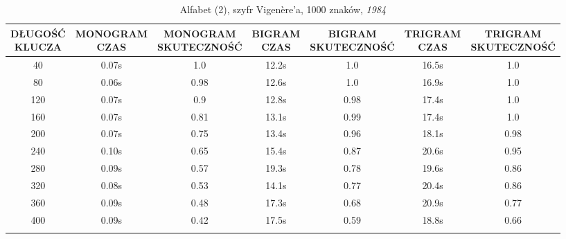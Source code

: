 \documentclass[a4paper]{article}
\theoremstyle{defn}
\theoremstyle{theorem}
\theoremstyle{lemma}
\theoremstyle{cor}
\theoremstyle{fact}
\begin{document}
\begin{center}\begin{small}\begin{longtable}{|c|c|c|c|c|c|c|}
\hline \makecell{DŁUGOŚĆ\\KLUCZA} &  \makecell{MONOGRAM\\CZAS} & \makecell{MONOGRAM\\SKUTECZNOŚĆ} & \makecell{BIGRAM\\CZAS} &  \makecell{BIGRAM\\SKUTECZNOŚĆ} & \makecell{TRIGRAM\\CZAS} & \makecell{TRIGRAM\\SKUTECZNOŚĆ}\\ \hline
40 & 0.07s & 1.0 & 12.2s & 1.0 & 16.5s & 1.0 \\ \hline
80 & 0.06s & 0.98 & 12.6s & 1.0 & 16.9s & 1.0 \\ \hline
120 & 0.07s & 0.9 & 12.8s & 0.98 & 17.4s & 1.0 \\ \hline
160 & 0.07s & 0.81 & 13.1s & 0.99 & 17.4s & 1.0 \\ \hline
200 & 0.07s & 0.75 & 13.4s & 0.96 & 18.1s & 0.98 \\ \hline
240 & 0.10s & 0.65 & 15.4s & 0.87 & 20.6s & 0.95 \\ \hline
280 & 0.09s & 0.57 & 19.3s & 0.78 & 19.6s & 0.86 \\ \hline
320 & 0.08s & 0.53 & 14.1s & 0.77 & 20.4s & 0.86 \\ \hline
360 & 0.09s & 0.48 & 17.3s & 0.68 & 20.9s & 0.77 \\ \hline
400 & 0.09s & 0.42 & 17.5s & 0.59 & 18.8s & 0.66 \\ \hline
\caption{Alfabet (2), szyfr Vigenère'a, 1000 znaków, \textit{1984}}
\end{longtable}\end{small}\end{center}
\end{document}
